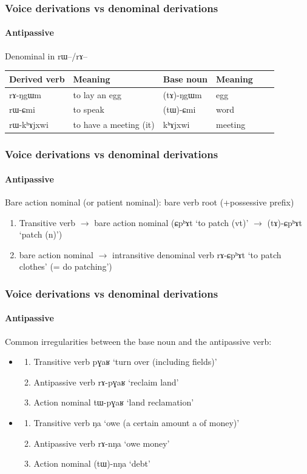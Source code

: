 \documentclass[xcolor=table]{beamer}
\newcommand{\ipa}[1]{{\phon \mbox{#1}}} %
\begin{document}
\begin{frame} 
\frametitle{Voice derivations vs denominal derivations} 
\framesubtitle{Antipassive} 
Denominal in \ipa{rɯ--}/\ipa{rɤ--}
\begin{tabular}{llllll}
\toprule
 Derived verb& Meaning &Base noun  & Meaning \\
\midrule
  \ipa{rɤ-ŋgɯm} & to lay an egg & \ipa{(tɤ)-ŋgɯm} &egg \\
  \ipa{rɯ-ɕmi} & to speak & \ipa{(tɯ)-ɕmi} & word  \\
  \ipa{rɯ-kʰɤjxwi} & to have a meeting (it) & \ipa{kʰɤjxwi} & meeting \\
 \bottomrule
\end{tabular}
\end{frame}    
 
 \begin{frame} 
\frametitle{Voice derivations vs denominal derivations} 
\framesubtitle{Antipassive} 
 
Bare action nominal (or patient nominal): bare verb root (+possessive prefix)
 \begin{enumerate}
\item Transitive verb $\rightarrow$ bare action nominal (\ipa{ɕpʰɤt} `to patch (vt)' $\rightarrow$ \ipa{(tɤ)-ɕpʰɤt} `patch (n)')
\item bare action nominal $\rightarrow$ intransitive denominal verb \ipa{rɤ-ɕpʰɤt} `to patch clothes' (= do patching')
\end{enumerate}
 
\end{frame}    
 
  \begin{frame} 
\frametitle{Voice derivations vs denominal derivations} 
\framesubtitle{Antipassive} 
 
Common irregularities between the base noun and the antipassive verb:
\begin{itemize}
\item
  \begin{enumerate}
\item Transitive verb \ipa{pɣaʁ} `turn over (including fields)' 
 \item Antipassive verb \ipa{rɤ-pɣaʁ} `reclaim land' 
  \item Action nominal \ipa{tɯ-pɣaʁ} `land reclamation' 
\end{enumerate}
 \item
   \begin{enumerate}
\item Transitive verb \ipa{ŋa} `owe (a certain amount a of money)' 
 \item Antipassive verb \ipa{rɤ-nŋa} `owe money' 
  \item Action nominal \ipa{(tɯ)-nŋa} `debt' 
\end{enumerate}
\end{itemize}

\end{frame}    
 
\end{document}
